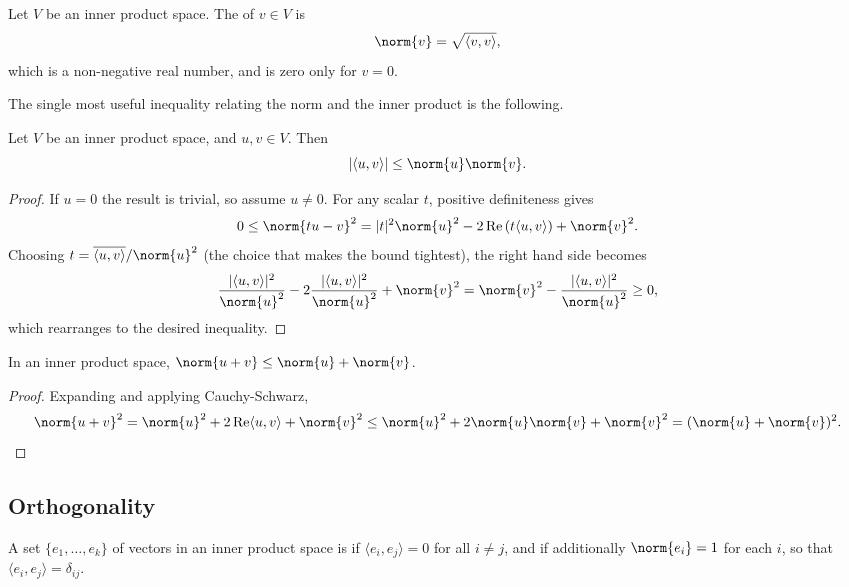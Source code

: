 \documentclass[a4paper]{scrartcl}
\begin{document}
\begin{definition}[Norm]
    Let $V$ be an inner product space. The  of $v \in V$ is
    $$
    \norm{v} = \sqrt{\langle v, v\rangle},
    $$
    which is a non-negative real number, and is zero only for $v = 0$.
\end{definition}

The single most useful inequality relating the norm and the inner product is the following.

\begin{theorem}
    Let $V$ be an inner product space, and $u, v \in V$. Then
    $$
    |\langle u, v \rangle| \leq \norm{u} \norm{v}.
    $$
\end{theorem}
\begin{proof}
    If $u = 0$ the result is trivial, so assume $u \neq 0$. For any scalar $t$, positive definiteness gives
    $$
    0 \leq \norm{tu - v}^2 = |t|^2 \norm{u}^2 - 2\re\left(t \langle u, v\rangle\right) + \norm{v}^2.
    $$
    Choosing $t = \overline{\langle u, v\rangle}/\norm{u}^2$ (the choice that makes the bound tightest), the right hand side becomes
    $$
    \frac{|\langle u, v\rangle|^2}{\norm{u}^2} - 2\frac{|\langle u, v\rangle|^2}{\norm{u}^2} + \norm{v}^2 = \norm{v}^2 - \frac{|\langle u, v\rangle|^2}{\norm{u}^2} \geq 0,
    $$
    which rearranges to the desired inequality.
\end{proof}

\begin{corollary}
    In an inner product space, $\norm{u + v} \leq \norm{u} + \norm{v}$.
\end{corollary}
\begin{proof}
    Expanding and applying Cauchy-Schwarz,
    $$
    \norm{u + v}^2 = \norm{u}^2 + 2\re \langle u, v\rangle + \norm{v}^2 \leq \norm{u}^2 + 2\norm{u}\norm{v} + \norm{v}^2 = (\norm{u} + \norm{v})^2. \qedhere
    $$
\end{proof}

\subsection{Orthogonality}

\begin{definition}
    A set $\{e_1, \dots, e_k\}$ of vectors in an inner product space is  if $\langle e_i, e_j \rangle = 0$ for all $i \neq j$, and  if additionally $\norm{e_i} = 1$ for each $i$, so that $\langle e_i, e_j \rangle = \delta_{ij}$.
\end{definition}
\end{document}
